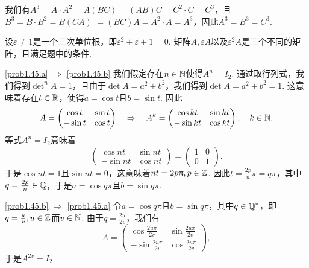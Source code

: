 \setcounter{solution}{43}
\begin{solution}
  \begin{enuma}
    \item 我们有$A^3=A\cdot A^2=A(BC)=(AB)C=C^2\cdot C=C^3$，且$B^3=B\cdot B^2=B(CA)$ $=(BC)A=A^2\cdot A=A^3$，因此$A^3=B^3=C^3$.
    \item 设$\varepsilon\ne1$是一个三次单位根，即$\varepsilon^2+\varepsilon+1=0$. 矩阵$A,\varepsilon A$以及$\varepsilon^2A$是三个不同的矩阵，且满足题中的条件.
  \end{enuma}
\end{solution}

\begin{solution}
  \ref{prob1.45.a} $\Rightarrow$ \ref{prob1.45.b} 我们假定存在$n\in\mathbb N$使得$A^n=I_2$. 通过取行列式，我们得到$\det\nolimits^nA=1$，且由于$\det A=a^2+b^2$，我们得到$\det A=a^2+b^2=1$. 这意味着存在$t\in\mathbb R$，使得$a=\cos t$且$b=\sin t$. 因此
  \[
    A = \begin{pmatrix}
      \cos t & \sin t \\
      -\sin t & \cos t
    \end{pmatrix} \quad \Rightarrow \quad
    A^k = \begin{pmatrix}
      \cos kt & \sin kt \\
      -\sin kt & \cos kt
    \end{pmatrix},\quad k\in\mathbb N.
  \]
  等式$A^n=I_2$意味着
  \[
    \begin{pmatrix}
      \cos nt & \sin nt \\
      -\sin nt & \cos nt
    \end{pmatrix} = \begin{pmatrix}
      1 & 0 \\
      0 & 1
    \end{pmatrix}.
  \]
  于是$\cos nt=1$且$\sin nt=0$，这意味着$nt=2p\uppi,p\in\mathbb Z$. 因此$t=\frac{2p}n\pi=q\pi$，其中$q=\frac{2p}n\in\mathbb Q$，于是$a=\cos q\pi$且$b=\sin q\pi$.

  \ref{prob1.45.b} $\Rightarrow$ \ref{prob1.45.a} 令$a=\cos q\pi$且$b=\sin q\pi$，其中$q\in\mathbb Q^\ast$，即$q=\frac uv,u\in\mathbb Z$而$v\in\mathbb N$. 由于$q=\frac{2u}{2v}$，我们有
  \[
    A = \begin{pmatrix}
      \cos \frac{2u\pi}{2v} & \sin \frac{2u\pi}{2v} \\
      -\sin \frac{2u\pi}{2v} & \cos \frac{2u\pi}{2v}
    \end{pmatrix},
  \]
  于是$A^{2v}=I_2$.
\end{solution}

